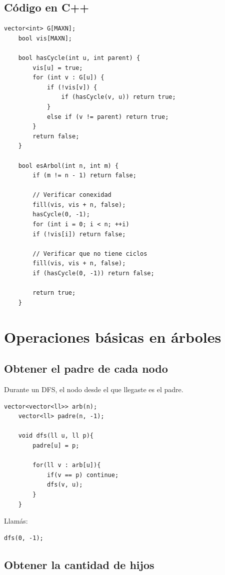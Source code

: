 \subsection*{Código en C++}

\begin{lstlisting}[caption=Verificar si grafo es árbol]
	vector<int> G[MAXN];
	bool vis[MAXN];
	
	bool hasCycle(int u, int parent) {
		vis[u] = true;
		for (int v : G[u]) {
			if (!vis[v]) {
				if (hasCycle(v, u)) return true;
			}
			else if (v != parent) return true;
		}
		return false;
	}
	
	bool esArbol(int n, int m) {
		if (m != n - 1) return false;
		
		// Verificar conexidad
		fill(vis, vis + n, false);
		hasCycle(0, -1);
		for (int i = 0; i < n; ++i)
		if (!vis[i]) return false;
		
		// Verificar que no tiene ciclos
		fill(vis, vis + n, false);
		if (hasCycle(0, -1)) return false;
		
		return true;
	}
\end{lstlisting}

\section{Operaciones básicas en árboles}

\subsection*{Obtener el padre de cada nodo}

Durante un DFS, el nodo desde el que llegaste es el padre.

\begin{lstlisting}[caption=Obtener padre de cada nodo]
	vector<vector<ll>> arb(n);
	vector<ll> padre(n, -1);
	
	void dfs(ll u, ll p){
		padre[u] = p;
		
		for(ll v : arb[u]){
			if(v == p) continue;
			dfs(v, u);
		}
	}
\end{lstlisting}

Llamás:

\begin{lstlisting}[caption=Llamada inicial del DFS]
	dfs(0, -1);
\end{lstlisting}

\subsection*{Obtener la cantidad de hijos}

